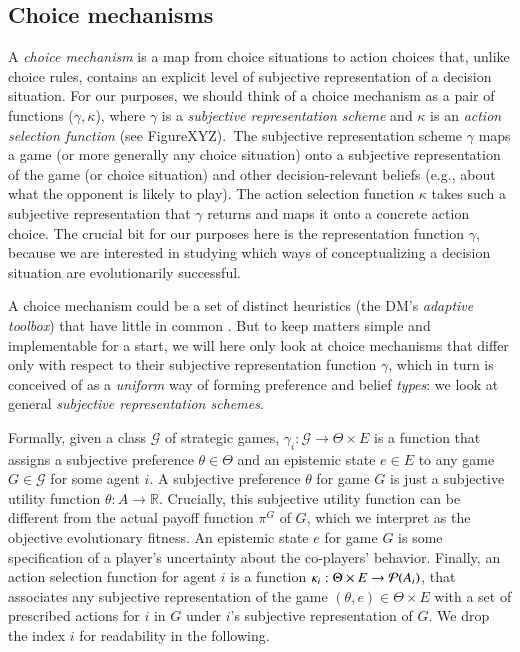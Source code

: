 \documentclass[fleqn,reqno,11pt]{article}
\begin{document}
\subsection{Choice mechanisms}
\label{sec:choice-mechanisms}

A \emph{choice mechanism} is a map from choice situations to action choices that, unlike choice
rules, contains an explicit level of subjective representation of a decision situation. For our
purposes, we should think of a choice mechanism as a pair of functions ($\gamma,\kappa$),
where $\gamma$ is a \emph{subjective representation scheme} and $\kappa$ is an \emph{action
  selection function} (see FigureXYZ).\ The subjective representation scheme $\gamma$ maps a game (or more generally any
choice situation) onto a subjective representation of the game (or choice situation) and
other decision-relevant beliefs (e.g., about what the opponent is likely to play). The action
selection function $\kappa$ takes such a subjective representation that $\gamma$ returns and
maps it onto a concrete action choice. The crucial bit for our purposes here is the
representation function $\gamma$, because we are interested in studying which ways of
conceptualizing a decision situation are evolutionarily successful.

A choice mechanism could be a set of distinct heuristics (the DM's \emph{adaptive toolbox})
that have little in common
\citep[e.g.,][]{TverskyKahnemann1981:The-Framing-of-,GigerenzerGoldstein1996:Reasoning-the-F,ScheibehenneRieskamp2013:Testing-the-Ada}. But
to keep matters simple and implementable for a start, we will here only look at choice
mechanisms that differ only with respect to their subjective representation function $\gamma$,
which in turn is conceived of as a \emph{uniform} way of forming preference and belief
\emph{types}: we look at general \emph{subjective representation schemes}.

Formally, given a class $ \mathcal{G} $ of strategic games,
$\gamma_i: \mathcal{G} \rightarrow \Theta \times E$ is a function that assigns a subjective
preference $\theta \in \Theta$ and an epistemic state $e \in E$ to any game
$G \in \mathcal{G}$ for some agent $i$. A subjective preference $\theta$ for game $G$ is just a subjective utility function $\theta:A \rightarrow \mathbb{R}$. Crucially, this subjective utility function can be different from the actual payoff function $\pi^G$ of $G$,
which we interpret as the objective evolutionary fitness. An epistemic state $e$ for game $G$ is some specification of a player's uncertainty about the co-players' behavior. Finally, an
action selection function for agent $i$ is a function
$\kappa_i: \Theta \times E \rightarrow \mathcal{P}(A_i) $, that associates any subjective
representation of the game $ (\theta,e) \in \Theta \times E$ with a set of prescribed
actions for $i$ in $G$ under $i$'s subjective representation of $G$. We drop the index $i$ for
readability in the following.
\end{document}
